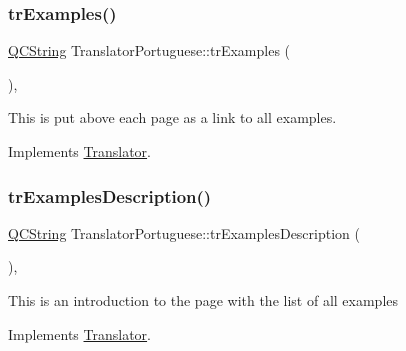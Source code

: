 \mbox{\label{class_translator_portuguese_af6b3271c54d8083d9a2a91a737b4e2f8}} 
\subsubsection{\texorpdfstring{trExamples()}{trExamples()}}
{\footnotesize\ttfamily \mbox{\hyperlink{class_q_c_string}{Q\+C\+String}} Translator\+Portuguese\+::tr\+Examples (\begin{DoxyParamCaption}{ }\end{DoxyParamCaption})\hspace{0.3cm}{\ttfamily [inline]}, {\ttfamily [virtual]}}

This is put above each page as a link to all examples. 

Implements \mbox{\hyperlink{class_translator}{Translator}}.

\mbox{\label{class_translator_portuguese_a2923bc757e192fb65a4c22ae7298bb51}} 
\subsubsection{\texorpdfstring{trExamplesDescription()}{trExamplesDescription()}}
{\footnotesize\ttfamily \mbox{\hyperlink{class_q_c_string}{Q\+C\+String}} Translator\+Portuguese\+::tr\+Examples\+Description (\begin{DoxyParamCaption}{ }\end{DoxyParamCaption})\hspace{0.3cm}{\ttfamily [inline]}, {\ttfamily [virtual]}}

This is an introduction to the page with the list of all examples 

Implements \mbox{\hyperlink{class_translator}{Translator}}.

\mbox{\label{class_translator_portuguese_a01f09c27b890470bffcde6e8274e3b71}} 

